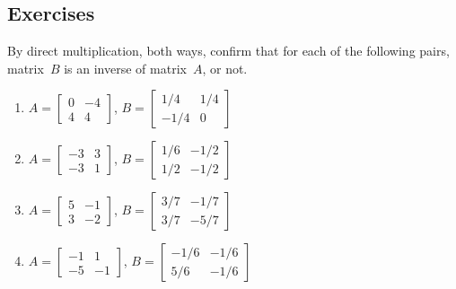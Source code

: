\begin{comment}
Could have a section on GF(2): that is, inverses of 0-1 matrices mod 2??  Relevant to computer science encoding and encryption---somehow.  Matlab/octave supports modular computation via gf() something and some package, respectively.
\end{comment}






\subsection{Exercises}


\begin{exercise} \label{ex:abinv} 
By direct multiplication, both ways, confirm that for each of the following pairs, matrix~\(B\) is an inverse of matrix~\(A\), or not.
\begin{enumerate}
\item \(A=\begin{bmatrix} 0&-4
\\4&4 \end{bmatrix}\), 
\(B=\begin{bmatrix} 1/4&1/4
\\-1/4&0 \end{bmatrix}\)

\item \(A=\begin{bmatrix} -3&3
\\-3&1 \end{bmatrix}\), 
\(B=\begin{bmatrix} 1/6&-1/2
\\1/2&-1/2 \end{bmatrix}\)

\item \(A=\begin{bmatrix} 5&-1
\\3&-2 \end{bmatrix}\), 
\(B=\begin{bmatrix} 3/7&-1/7
\\3/7&-5/7 \end{bmatrix}\)

\item \(A=\begin{bmatrix} -1&1
\\-5&-1 \end{bmatrix}\), 
\(B=\begin{bmatrix} -1/6&-1/6
\\5/6&-1/6 \end{bmatrix}\)


\end{enumerate}
\end{exercise}
